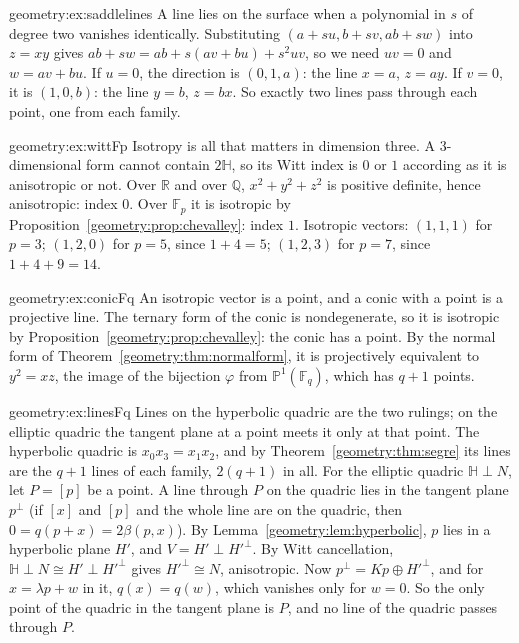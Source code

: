 \begin{solution}{geometry:ex:saddlelines}
\idea A line lies on the surface when a polynomial in $s$ of degree two vanishes identically.
\writeup Substituting $(a+su,b+sv,ab+sw)$ into $z=xy$ gives $ab+sw=ab+s(av+bu)+s^2uv$, so we need $uv=0$ and $w=av+bu$. If $u=0$, the direction is
$(0,1,a)$: the line $x=a$, $z=ay$. If $v=0$, it is $(1,0,b)$: the line $y=b$, $z=bx$. So exactly two lines pass through each point, one from each family.
\end{solution}

\begin{solution}{geometry:ex:wittFp}
\idea Isotropy is all that matters in dimension three.
\writeup A $3$-dimensional form cannot contain $2\mathbb H$, so its Witt index is $0$ or $1$ according as it is anisotropic or not. Over $\mathbb R$ and
over $\mathbb Q$, $x^2+y^2+z^2$ is positive definite, hence anisotropic: index $0$. Over $\mathbb F_p$ it is isotropic by Proposition~\ref{geometry:prop:chevalley}:
index $1$. Isotropic vectors: $(1,1,1)$ for $p=3$; $(1,2,0)$ for $p=5$, since $1+4=5$; $(1,2,3)$ for $p=7$, since $1+4+9=14$.
\end{solution}

\begin{solution}{geometry:ex:conicFq}
\idea An isotropic vector is a point, and a conic with a point is a projective line.
\writeup The ternary form of the conic is nondegenerate, so it is isotropic by Proposition~\ref{geometry:prop:chevalley}: the conic has a point. By the normal
form of Theorem~\ref{geometry:thm:normalform}, it is projectively equivalent to $y^2=xz$, the image of the bijection $\varphi$ from $\mathbb P^1(\mathbb F_q)$,
which has $q+1$ points.
\end{solution}

\begin{solution}{geometry:ex:linesFq}
\idea Lines on the hyperbolic quadric are the two rulings; on the elliptic quadric the tangent plane at a point meets it only at that point.
\writeup The hyperbolic quadric is $x_0x_3=x_1x_2$, and by Theorem~\ref{geometry:thm:segre} its lines are the $q+1$ lines of each family, $2(q+1)$ in all. For the
elliptic quadric $\mathbb H\perp N$, let $P=[p]$ be a point. A line through $P$ on the quadric lies in the tangent plane $p^\perp$ (if $[x]$ and $[p]$ and
the whole line are on the quadric, then $0=q(p+x)=2\beta(p,x)$). By Lemma~\ref{geometry:lem:hyperbolic}, $p$ lies in a hyperbolic plane $H'$, and
$V=H'\perp H'^\perp$. By Witt cancellation, $\mathbb H\perp N\cong H'\perp H'^\perp$ gives $H'^\perp\cong N$, anisotropic. Now $p^\perp=Kp\oplus H'^\perp$, and for
$x=\lambda p+w$ in it, $q(x)=q(w)$, which vanishes only for $w=0$. So the only point of the quadric in the tangent plane is $P$, and no line of the
quadric passes through $P$.
\end{solution}

